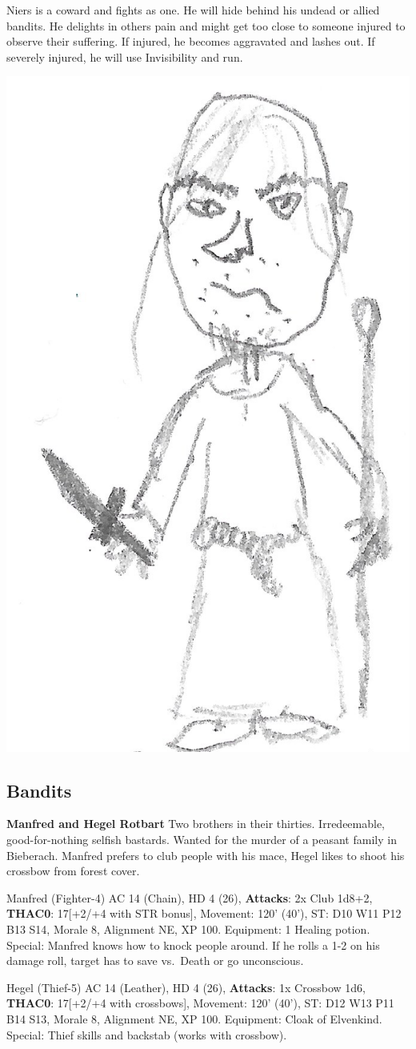 \documentclass[
]{book}
\begin{document}
Niers is a coward and fights as one. He will hide behind his undead or allied bandits. He delights in others pain and might get too close to someone injured to observe their suffering. If injured, he becomes aggravated and lashes out. If severely injured, he will use Invisibility and run.

\begin{center}\includegraphics[width=0.5\linewidth]{graphics/peter_niers} \end{center}

\subsection{Bandits}\label{bandits}

\textbf{Manfred and Hegel Rotbart}
Two brothers in their thirties. Irredeemable, good-for-nothing selfish bastards. Wanted for the murder of a peasant family in Bieberach.
Manfred prefers to club people with his mace, Hegel likes to shoot his crossbow from forest cover.

Manfred (Fighter-4) AC 14 (Chain), HD 4 (26), \textbf{Attacks}: 2x Club 1d8+2, \textbf{THAC0}: 17{[}+2/+4 with STR bonus{]}, Movement: 120' (40'), ST: D10 W11 P12 B13 S14, Morale 8, Alignment NE, XP 100. Equipment: 1 Healing potion. Special: Manfred knows how to knock people around. If he rolls a 1-2 on his damage roll, target has to save vs.~Death or go unconscious.

Hegel (Thief-5) AC 14 (Leather), HD 4 (26), \textbf{Attacks}: 1x Crossbow 1d6, \textbf{THAC0}: 17{[}+2/+4 with crossbows{]}, Movement: 120' (40'), ST: D12 W13 P11 B14 S13, Morale 8, Alignment NE, XP 100. Equipment: Cloak of Elvenkind. Special: Thief skills and backstab (works with crossbow).
\end{document}
